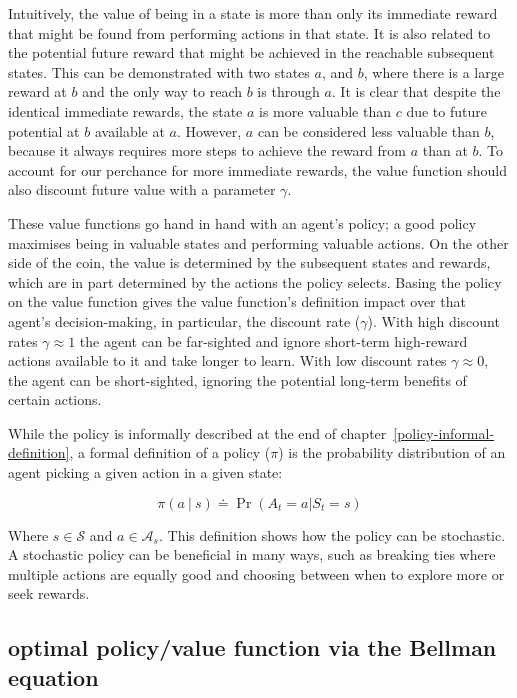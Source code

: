 \documentclass[]{final_report}
\begin{document}
Intuitively, the value of being in a state is more than only its immediate reward that might be found from performing actions in that state. It is also related to the potential future reward that might be achieved in the reachable subsequent states. This can be demonstrated with two states $a$, and $b$, where there is a large reward at $b$ and the only way to reach $b$ is through $a$. It is clear that despite the identical immediate rewards, the state $a$ is more valuable than $c$ due to future potential at $b$ available at $a$. However, $a$ can be considered less valuable than $b$, because it always requires more steps to achieve the reward from $a$ than at $b$. To account for our perchance for more immediate rewards, the value function should also discount future value with a parameter $\gamma$. 


These value functions go hand in hand with an agent's policy; a good policy maximises being in valuable states and performing valuable actions. On the other side of the coin, the value is determined by the subsequent states and rewards, which are in part determined by the actions the policy selects. Basing the policy on the value function gives the value function's definition impact over that agent's decision-making, in particular, the \label{discount-rate-introduction}discount rate ($\gamma$). With high discount rates $\gamma \approx 1$ the agent can be far-sighted and ignore short-term high-reward actions available to it and take longer to learn. With low discount rates $\gamma \approx 0$, the agent can be short-sighted, ignoring the potential long-term benefits of certain actions.

While the policy is informally described at the end of chapter~\ref{policy-informal-definition}, a formal definition of a policy ($\pi$) is the probability distribution of an agent picking a given action in a given state:

\begin{equation}
  \pi(a \ |\ s) \doteq \Pr(A_t = a | S_t = s)
  \label{eqn:policy-def}
\end{equation}



Where $s \in \mathcal{S}$ and $a \in \mathcal{A}_s$. This definition shows how the policy can be stochastic. A stochastic policy can be beneficial in many ways, such as breaking ties where multiple actions are equally good and choosing between when to explore more or seek rewards. 

\subsection{optimal policy/value function via the Bellman equation}
\end{document}
